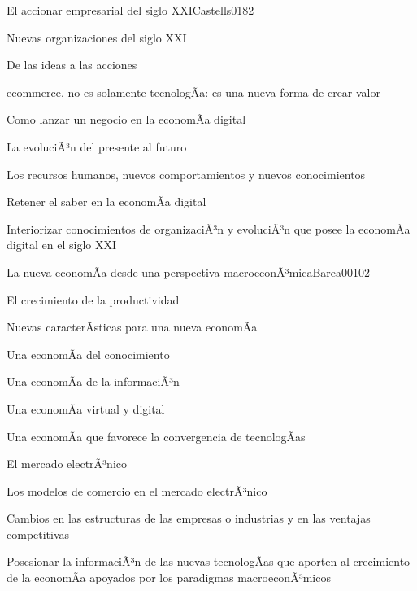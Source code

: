 \begin{syllabus}
\begin{unit}{El accionar empresarial del siglo XXI}{Castells01}{8}{2}
   \begin{topics}
      \item Nuevas organizaciones del siglo XXI
	\item De las ideas a las acciones
	\item ecommerce, no es solamente tecnologÃ­a: es una nueva forma de crear valor
	\item Como lanzar un negocio en la economÃ­a digital
	\item La evoluciÃ³n del presente al futuro
	\item Los recursos humanos, nuevos comportamientos y nuevos conocimientos
	\item Retener el saber en la economÃ­a digital
   \end{topics}

   \begin{unitgoals}
      \item Interiorizar conocimientos de organizaciÃ³n y evoluciÃ³n que posee la economÃ­a digital en el siglo XXI
   \end{unitgoals}
\end{unit}

\begin{unit}{La nueva economÃ­a desde una perspectiva macroeconÃ³mica}{Barea00}{10}{2}
   \begin{topics}
      \item El crecimiento de la productividad
	\item Nuevas caracterÃ­sticas para una nueva economÃ­a
	\item Una economÃ­a del conocimiento
	\item Una economÃ­a de la informaciÃ³n
	\item Una economÃ­a virtual y digital
	\item Una economÃ­a que favorece la convergencia de tecnologÃ­as
	\item El mercado electrÃ³nico
	\item Los modelos de comercio en el mercado electrÃ³nico
	\item Cambios en las estructuras de las empresas o industrias y en las ventajas competitivas
  \end{topics}

   \begin{unitgoals}
      \item Posesionar la informaciÃ³n de las nuevas tecnologÃ­as que aporten al crecimiento de la economÃ­a apoyados por los paradigmas macroeconÃ³micos
   \end{unitgoals}
\end{unit}


\end{syllabus}
